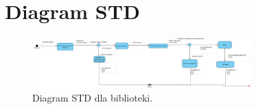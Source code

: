 \documentclass[12pt]{article}
\begin{document}
\newpage
\section{Diagram STD}
\begin{figure}[!h]
    \centering
    \includegraphics[width=0.75\textwidth]{Schemat_STD}
    \caption{Diagram STD dla biblioteki.}
\end{figure}
\end{document}
